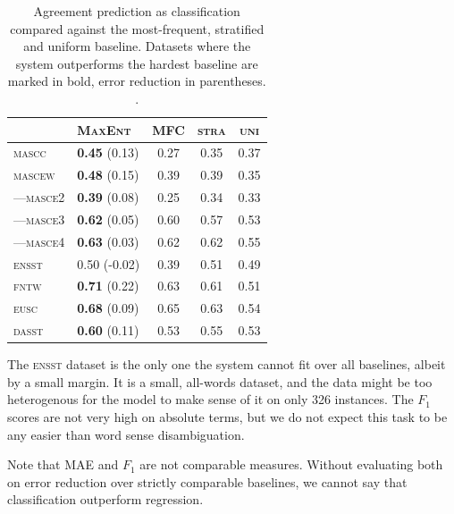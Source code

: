 \documentclass[11pt,a4paper]{article}
\begin{document}
\begin{table}[Ht!]

\begin{center}
  \begin{tabular}{ll|ccc}
 \toprule
 & \textsc{MaxEnt} & \textsc{MFC} & \textsc{stra} & \textsc{uni} \\
 \midrule
 \textsc{mascc} & \textbf{0.45} (0.13) & 0.27 & 0.35 & 0.37\\ 

 \textsc{mascew} & \textbf{0.48} (0.15)  & 0.39 & 0.39 & 0.35\\ 
---\textsc{masce2} & \textbf{0.39} (0.08) & 0.25 & 0.34 & 0.33\\ 
---\textsc{masce3} & \textbf{0.62} (0.05) & 0.60 & 0.57 & 0.53\\ 
---\textsc{masce4} & \textbf{0.63} (0.03)& 0.62 & 0.62 & 0.55\\ 
\textsc{ensst}  & 0.50 (-0.02) & 0.39 & 0.51 & 0.49\\ 
\textsc{fntw} & \textbf{0.71} (0.22) & 0.63 & 0.61 & 0.51\\ 

\textsc{eusc}  & \textbf{0.68} (0.09) & 0.65 & 0.63 & 0.54 \\
\textsc{dasst} & \textbf{0.60} (0.11) & 0.53 & 0.55 & 0.53\\ 

\bottomrule

  \end{tabular}  
\end{center}
\caption{Agreement prediction as classification compared against the most-frequent, stratified and uniform baseline. Datasets where the system outperforms the hardest baseline are marked in bold, error reduction in parentheses. \label{tab:classresults}.}
\end{table} 

The \textsc{ensst} dataset is the only one the system cannot fit over all baselines, albeit by a small margin. It is a small, all-words dataset, and the data might be too heterogenous for the model to make sense of it on only 326 instances. The $F_1$ scores are not very high on absolute terms, but we do not expect this task to be any easier than word sense disambiguation. 

Note that MAE and $F_1$ are not comparable measures. Without evaluating both on error reduction over strictly comparable baselines, we cannot say that classification outperform regression.
\end{document}
